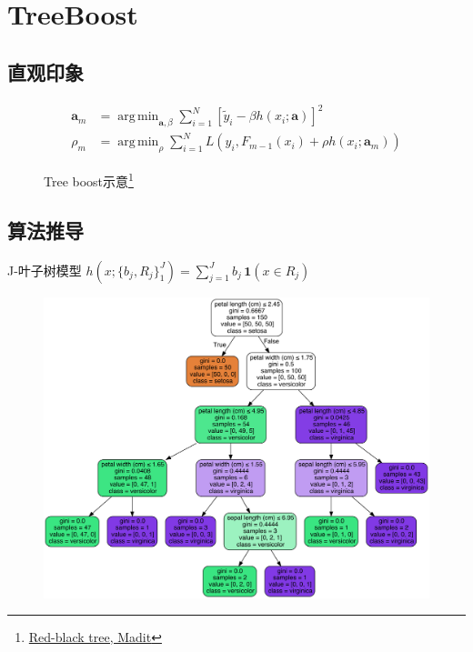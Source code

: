 
\section{TreeBoost}
\subsection{直观印象}
\begin{frame}
    \begin{align*}
        \mathbf{a}_m &= \operatorname{arg \, min}_{\mathbf{a}, \beta} \textstyle \sum_{i=1}^N \left [ \tilde{y}_i - \beta h(x_i; \mathbf{a}) \right ]^2 \\
        \rho_m &= \operatorname{arg \, min}_\rho \textstyle \sum_{i=1}^N L \left ( y_i, F_{m-1}(x_i) + \rho h(x_i; \mathbf{a}_m) \right)
    \end{align*}

    \begin{figure}
        \centering
        \resizebox{\onepicwidth}{!}{}
        \caption{Tree boost示意\footnote{
                 \href{http://www.texample.net/tikz/examples/red-black-tree/}{Red-black tree, Madit}}}
    \end{figure}
\end{frame}


\subsection{算法推导}
\begin{frame}{J-叶子树模型}
    $h(x; \{b_j, R_j\}_1^J) = \sum_{j=1}^J b_j \, \mathbf{1}(x \in R_j)$

    \begin{figure}[!tb]
        \includegraphics[width=\twopicwidth]{figure/decision_tree/iris}
    \end{figure}
\end{frame}

